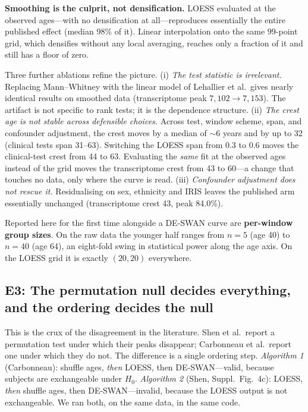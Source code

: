 \documentclass{article}
\begin{document}
\textbf{Smoothing is the culprit, not densification.} LOESS evaluated at the observed ages---with no densification at all---reproduces essentially the entire published effect (median 98\% of it). Linear interpolation onto the same 99-point grid, which densifies without any local averaging, reaches only a fraction of it and still has a floor of zero.

Three further ablations refine the picture. (i) \emph{The test statistic is irrelevant.} Replacing Mann--Whitney with the linear model of Lehallier et al.\ gives nearly identical results on smoothed data (transcriptome peak $7{,}102 \rightarrow 7{,}153$). The artifact is not specific to rank tests; it is the dependence structure. (ii) \emph{The crest age is not stable across defensible choices.} Across test, window scheme, span, and confounder adjustment, the crest moves by a median of ${\sim}6$ years and by up to 32 (clinical tests span 31--63). Switching the LOESS span from 0.3 to 0.6 moves the clinical-test crest from 44 to 63. Evaluating the \emph{same} fit at the observed ages instead of the grid moves the transcriptome crest from 43 to 60---a change that touches no data, only where the curve is read. (iii) \emph{Confounder adjustment does not rescue it.} Residualising on sex, ethnicity and IRIS leaves the published arm essentially unchanged (transcriptome crest 43, peak 84.0\%).

Reported here for the first time alongside a DE-SWAN curve are \textbf{per-window group sizes}. On the raw data the younger half ranges from $n=5$ (age 40) to $n=40$ (age 64), an eight-fold swing in statistical power along the age axis. On the LOESS grid it is exactly $(20,20)$ everywhere.

\subsection{E3: The permutation null decides everything, and the ordering decides the null}

This is the crux of the disagreement in the literature. Shen et al.\ report a permutation test under which their peaks disappear; Carbonneau et al.\ report one under which they do not. The difference is a single ordering step. \emph{Algorithm 1} (Carbonneau): shuffle ages, \emph{then} LOESS, then DE-SWAN---valid, because subjects are exchangeable under $H_0$. \emph{Algorithm 2} (Shen, Suppl.\ Fig.\ 4c): LOESS, \emph{then} shuffle ages, then DE-SWAN---invalid, because the LOESS output is not exchangeable. We ran both, on the same data, in the same code.
\end{document}

